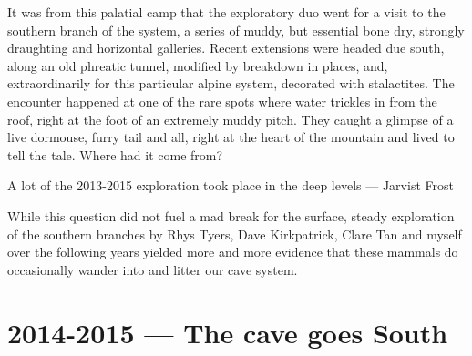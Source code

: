 It was from this palatial camp that the exploratory duo went for a visit to the southern branch of the system, a series of muddy, but essential bone dry, strongly draughting and horizontal galleries. Recent extensions were headed due south, along an old phreatic tunnel, modified by breakdown in places, and, extraordinarily for this particular alpine system, decorated with stalactites. The encounter happened at one of the rare spots where water trickles in from the roof, right at the foot of an extremely muddy pitch. They caught a glimpse of a live dormouse, furry tail and all, right at the heart of the mountain and lived to tell the tale. Where had it come from? 

\begin{marginfigure}
	\checkoddpage \ifoddpage \forcerectofloat \else \forceversofloat \fi
	\centering	{} 
  	\caption{A lot of the 2013-2015 exploration took place in the deep \protect{} levels --- Jarvist Frost}
	\end{marginfigure}


While this question did not fuel a mad break for the surface, steady exploration of the southern branches by Rhys Tyers, Dave Kirkpatrick, Clare Tan and myself over the following years yielded more and more evidence that these mammals do occasionally wander into and litter our cave system.

\section{2014-2015 --- The cave goes South}

